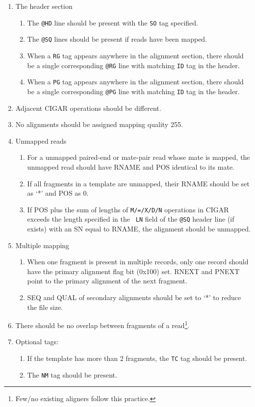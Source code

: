 \documentclass[10pt]{article}
\begin{document}
\begin{enumerate}
\item The header section
  \begin{enumerate}[label*=\arabic*]
  \item The {\tt @HD} line should be present with the {\tt SO} tag specified.
  \item The {\tt @SQ} lines should be present if reads have been mapped.
  \item When a {\tt RG} tag appears anywhere in the alignment section,
    there should be a single corresponding {\tt @RG} line with matching
    {\tt ID} tag in the header.
  \item When a {\tt PG} tag appears anywhere in the alignment section,
    there should be a single corresponding {\tt @PG} line with matching
    {\tt ID} tag in the header.
  \end{enumerate}
\item Adjacent CIGAR operations should be different.
\item No alignments should be assigned mapping quality 255.
\item Unmapped reads
  \begin{enumerate}[label*=\arabic*]
  \item For a unmapped paired-end or mate-pair read whose mate is
    mapped, the unmapped read should have {\sf RNAME} and {\sf POS}
    identical to its mate.
  \item If all fragments in a template are unmapped, their {\sf RNAME}
    should be set as `*' and {\sf POS} as 0.
  \item If {\sf POS} plus the sum of lengths of {\tt M/=/X/D/N}
    operations in {\sf CIGAR} exceeds the length specified in the {\tt
      LN} field of the {\tt @SQ} header line (if exists) with an SN
    equal to {\sf RNAME}, the alignment should be unmapped.
  \end{enumerate}
\item Multiple mapping
  \begin{enumerate}[label*=\arabic*]
  \item When one fragment is present in multiple records, only one
    record should have the primary alignment flag bit (0x100) set. {\sf
      RNEXT} and {\sf PNEXT} point to the primary alignment of the next
    fragment.
  \item {\sf SEQ} and {\sf QUAL} of secondary alignments should be set
    to `*' to reduce the file size.
  \end{enumerate}
\item There should be no overlap between fragments of a read\footnote{Few/no
  existing aligners follow this practice.}.
\item Optional tags:
  \begin{enumerate}[label*=\arabic*]
  \item If the template has more than 2 fragments, the {\tt TC} tag
    should be present.
  \item The {\tt NM} tag should be present.
  \end{enumerate}
\end{enumerate}
\end{document}
